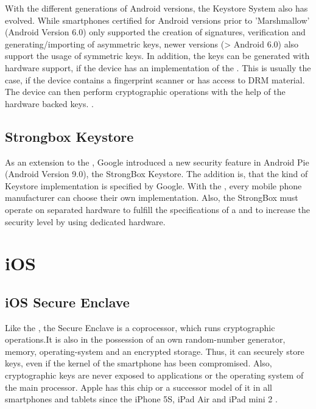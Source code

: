 \documentclass[12pt,oneside,a4paper,parskip]{scrbook}
\begin{document}
With the different generations of Android versions, the Keystore System also has evolved. While smartphones certified for Android versions prior to 'Marshmallow' (Android Version 6.0) only supported the creation of signatures, verification and generating/importing of asymmetric keys, newer versions (> Android 6.0) also support the usage of symmetric keys. In addition, the keys can be generated with hardware support, if the device has an implementation of the . This is usually the case, if the device contains a fingerprint scanner or has access to DRM material. The device can then perform cryptographic operations with the help of the hardware backed keys. \parencite{google_hardware-backed_2020}.


\subsection{Strongbox Keystore}
\label{subsec:strongbox}
As an extension to the , Google introduced a new security feature in Android Pie (Android Version 9.0), the StrongBox Keystore. The addition is, that the kind of Keystore implementation is specified by Google. With the , every mobile phone manufacturer can choose their own implementation. Also, the StrongBox must operate on separated hardware to fulfill the specifications of a  and to increase the security level by using dedicated hardware.


\section{iOS}

\subsection{iOS Secure Enclave}
\label{subsec:sec_enclave}

Like the , the Secure Enclave is a coprocessor, which runs cryptographic operations.It is also in the possession of an own random-number generator, memory, operating-system and an encrypted storage. Thus, it can securely store keys, even if the kernel of the smartphone has been compromised. Also, cryptographic keys are never exposed to applications or the operating system of the main processor. Apple has this chip or a successor model of it in all smartphones and tablets since the iPhone 5S, iPad Air and iPad mini 2 \parencite{apple_storing_2020}.
\end{document}
